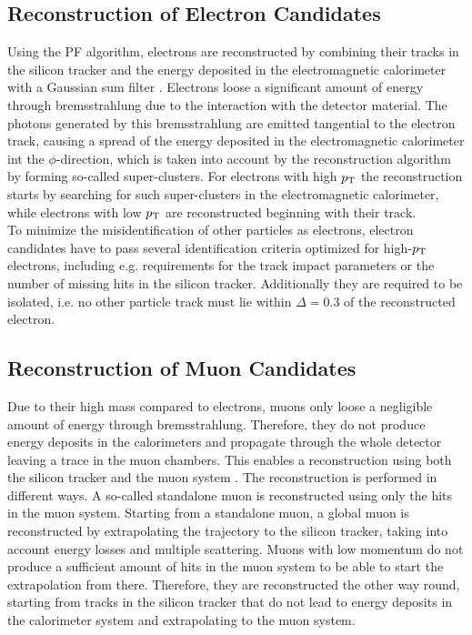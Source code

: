 \subsection{Reconstruction of Electron Candidates}
Using the PF algorithm, electrons are reconstructed by combining their tracks in the silicon tracker and the energy deposited in the electromagnetic calorimeter with a Gaussian sum filter \cite{elreco1}. Electrons loose a significant amount of energy through bremsstrahlung due to the interaction with the detector material. The photons generated by this bremsstrahlung are emitted tangential to the electron track, causing a spread of the energy deposited in the electromagnetic calorimeter int the $\phi$-direction, which is taken into account by the reconstruction algorithm by forming so-called super-clusters. For electrons with high $p_{\rm T}$ the reconstruction starts by searching for such super-clusters in the electromagnetic calorimeter, while electrons with low $p_{\rm T}$ are reconstructed beginning with their track.\\

\noindent To minimize the misidentification of other particles as electrons, electron candidates have to pass several identification criteria optimized for high-$p_{\rm T}$ electrons, including e.g. requirements for the track impact parameters or the number of missing hits in the silicon tracker. Additionally they are required to be isolated, i.e. no other particle track must lie within $\Delta=0.3$ of the reconstructed electron.
\subsection{Reconstruction of Muon Candidates}
Due to their high mass compared to electrons, muons  only loose a negligible amount of energy through bremsstrahlung. Therefore, they do not produce energy deposits in the calorimeters and propagate through the whole detector leaving a trace in the muon chambers. This enables a reconstruction using both the silicon tracker and the muon system \cite{muonreco}. The reconstruction is performed in different ways. A so-called standalone muon is reconstructed using only the hits in the muon system. Starting from a standalone muon, a global muon is reconstructed by extrapolating the trajectory to the silicon tracker, taking into account energy losses and multiple scattering. Muons with low momentum do not produce a sufficient amount of hits in the muon system to be able to start the extrapolation from there. Therefore, they are reconstructed the other way round, starting from tracks in the silicon tracker that do not lead to energy deposits in the calorimeter system and extrapolating to the muon system.

